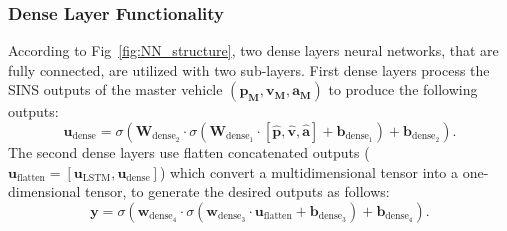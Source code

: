 \documentclass[3p]{elsarticle}
\begin{document}
\subsubsection{Dense Layer Functionality}
\noindent According to Fig~\ref{fig:NN_structure}, two dense layers neural networks, that are fully connected, are utilized
with two sub-layers.
First dense layers process the SINS outputs of the master vehicle \(
(\mathbf{p_M}, \mathbf{v_M}, \mathbf{a_M})
\)
to produce the following outputs:
\begin{equation}
\mathbf{u}_{\text{dense}}  = \sigma(\mathbf{W}_{\text{dense}_2} \cdot \sigma(\mathbf{W}_{\text{dense}_1} \cdot
	[\hat{\mathbf{p}}, \hat{\mathbf{v}}, \hat{\mathbf{a}}]
	 + \mathbf{b}_{\text{dense}_1}) + \mathbf{b}_{\text{dense}_2}).
\end{equation}
The second dense layers use flatten concatenated outputs
(\(\mathbf{u}_{\text{flatten}} =
\left[
	\mathbf{u}_{\text{LSTM}},
	\mathbf{u}_{\text{dense}}
\right]
\)) which convert a multidimensional tensor into a one-dimensional tensor, to generate the desired outputs as follows:
\begin{equation}
\mathbf{y} = \sigma(\mathbf{w}_{\text{dense}_4} \cdot \sigma(\mathbf{w}_{\text{dense}_3} \cdot \mathbf{u}_{\text{flatten}}
	 + \mathbf{b}_{\text{dense}_3}) + \mathbf{b}_{\text{dense}_4}).
\end{equation}


\end{document}
